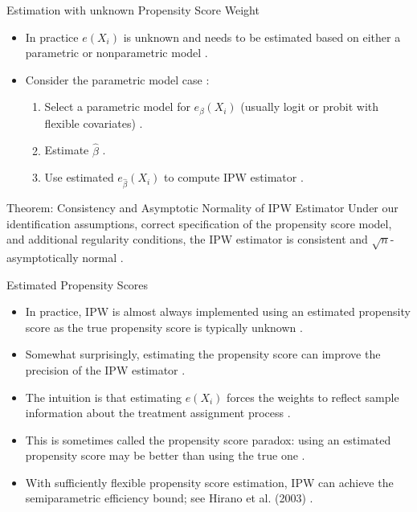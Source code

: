 \documentclass[11pt,aspectratio=169]{beamer}
\begin{document}
\begin{frame}{Estimation with unknown Propensity Score Weight}

\begin{itemize}
    \item In practice $e(X_i)$ is unknown and needs to be estimated based on either a parametric or nonparametric model .
    \item Consider the parametric model case :
    \begin{enumerate}
        \item[(0)] Select a parametric model for $e_{\beta}(X_i)$ (usually logit or probit with flexible covariates) .
        \item[(1)] Estimate $\widehat{\beta}$ .
        \item[(2)] Use estimated $e_{\widehat{\beta}}(X_i)$ to compute IPW estimator .
    \end{enumerate}
\end{itemize}

\begin{theorembox}{Theorem: Consistency and Asymptotic Normality of IPW Estimator}
Under our identification assumptions, correct specification of the propensity score model, and additional regularity conditions, the IPW estimator is consistent and $\sqrt{n}$-asymptotically normal .
\end{theorembox}
\end{frame}

\begin{frame}{Estimated Propensity Scores}

\begin{itemize}
    \item In practice, IPW is almost always implemented using an estimated propensity score as the true propensity score is typically unknown .
    \item Somewhat surprisingly, estimating the propensity score can improve the precision of the IPW estimator .
    \item The intuition is that estimating $e(X_i)$ forces the weights to reflect sample information about the treatment assignment process .
    \item This is sometimes called the propensity score paradox: using an estimated propensity score may be better than using the true one .
    \item With sufficiently flexible propensity score estimation, IPW can achieve the semiparametric efficiency bound; see Hirano et al. (2003) .
\end{itemize}
\end{frame}
\end{document}
